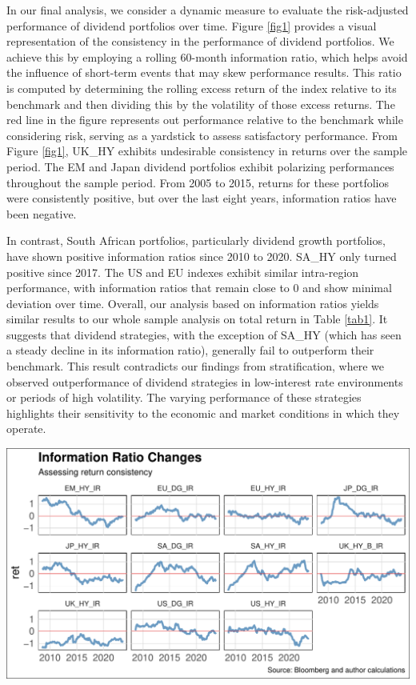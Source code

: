\documentclass[11pt,preprint, authoryear]{elsarticle}
\let\origfigure\figure
\let\endorigfigure\endfigure
\renewenvironment{figure}[1][2] {
    \expandafter\origfigure\expandafter[H]
} {
    \endorigfigure
}
\numberwithin{equation}{section}
\numberwithin{figure}{section}
\numberwithin{table}{section}
\begin{document}
In our final analysis, we consider a dynamic measure to evaluate the
risk-adjusted performance of dividend portfolios over time. Figure
\ref{fig1} provides a visual representation of the consistency in the
performance of dividend portfolios. We achieve this by employing a
rolling 60-month information ratio, which helps avoid the influence of
short-term events that may skew performance results. This ratio is
computed by determining the rolling excess return of the index relative
to its benchmark and then dividing this by the volatility of those
excess returns. The red line in the figure represents out performance
relative to the benchmark while considering risk, serving as a yardstick
to assess satisfactory performance. From Figure \ref{fig1}, UK\_HY
exhibits undesirable consistency in returns over the sample period. The
EM and Japan dividend portfolios exhibit polarizing performances
throughout the sample period. From 2005 to 2015, returns for these
portfolios were consistently positive, but over the last eight years,
information ratios have been negative.

In contrast, South African portfolios, particularly dividend growth
portfolios, have shown positive information ratios since 2010 to 2020.
SA\_HY only turned positive since 2017. The US and EU indexes exhibit
similar intra-region performance, with information ratios that remain
close to 0 and show minimal deviation over time. Overall, our analysis
based on information ratios yields similar results to our whole sample
analysis on total return in Table \ref{tab1}. It suggests that dividend
strategies, with the exception of SA\_HY (which has seen a steady
decline in its information ratio), generally fail to outperform their
benchmark. This result contradicts our findings from stratification,
where we observed outperformance of dividend strategies in low-interest
rate environments or periods of high volatility. The varying performance
of these strategies highlights their sensitivity to the economic and
market conditions in which they operate.

\begin{figure}[H]

\includegraphics{Much_Ado_About_Dividends_files/figure-latex/unnamed-chunk-1-1} \hfill{}

\caption{Rolling 3 Year Returns \label{fig1}}\label{fig:unnamed-chunk-1}
\end{figure}
\end{document}
